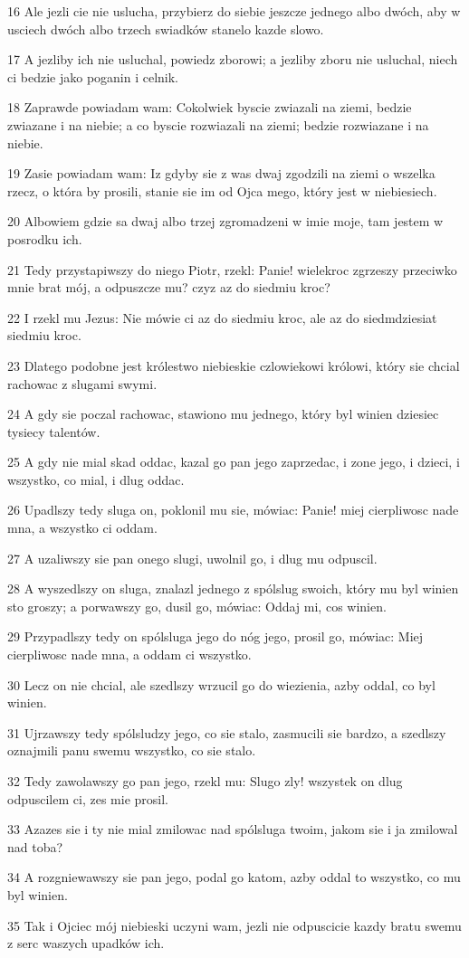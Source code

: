 \par 16 Ale jezli cie nie uslucha, przybierz do siebie jeszcze jednego albo dwóch, aby w usciech dwóch albo trzech swiadków stanelo kazde slowo.
\par 17 A jezliby ich nie usluchal, powiedz zborowi; a jezliby zboru nie usluchal, niech ci bedzie jako poganin i celnik.
\par 18 Zaprawde powiadam wam: Cokolwiek byscie zwiazali na ziemi, bedzie zwiazane i na niebie; a co byscie rozwiazali na ziemi; bedzie rozwiazane i na niebie.
\par 19 Zasie powiadam wam: Iz gdyby sie z was dwaj zgodzili na ziemi o wszelka rzecz, o która by prosili, stanie sie im od Ojca mego, który jest w niebiesiech.
\par 20 Albowiem gdzie sa dwaj albo trzej zgromadzeni w imie moje, tam jestem w posrodku ich.
\par 21 Tedy przystapiwszy do niego Piotr, rzekl: Panie! wielekroc zgrzeszy przeciwko mnie brat mój, a odpuszcze mu? czyz az do siedmiu kroc?
\par 22 I rzekl mu Jezus: Nie mówie ci az do siedmiu kroc, ale az do siedmdziesiat siedmiu kroc.
\par 23 Dlatego podobne jest królestwo niebieskie czlowiekowi królowi, który sie chcial rachowac z slugami swymi.
\par 24 A gdy sie poczal rachowac, stawiono mu jednego, który byl winien dziesiec tysiecy talentów.
\par 25 A gdy nie mial skad oddac, kazal go pan jego zaprzedac, i zone jego, i dzieci, i wszystko, co mial, i dlug oddac.
\par 26 Upadlszy tedy sluga on, poklonil mu sie, mówiac: Panie! miej cierpliwosc nade mna, a wszystko ci oddam.
\par 27 A uzaliwszy sie pan onego slugi, uwolnil go, i dlug mu odpuscil.
\par 28 A wyszedlszy on sluga, znalazl jednego z spólslug swoich, który mu byl winien sto groszy; a porwawszy go, dusil go, mówiac: Oddaj mi, cos winien.
\par 29 Przypadlszy tedy on spólsluga jego do nóg jego, prosil go, mówiac: Miej cierpliwosc nade mna, a oddam ci wszystko.
\par 30 Lecz on nie chcial, ale szedlszy wrzucil go do wiezienia, azby oddal, co byl winien.
\par 31 Ujrzawszy tedy spólsludzy jego, co sie stalo, zasmucili sie bardzo, a szedlszy oznajmili panu swemu wszystko, co sie stalo.
\par 32 Tedy zawolawszy go pan jego, rzekl mu: Slugo zly! wszystek on dlug odpuscilem ci, zes mie prosil.
\par 33 Azazes sie i ty nie mial zmilowac nad spólsluga twoim, jakom sie i ja zmilowal nad toba?
\par 34 A rozgniewawszy sie pan jego, podal go katom, azby oddal to wszystko, co mu byl winien.
\par 35 Tak i Ojciec mój niebieski uczyni wam, jezli nie odpuscicie kazdy bratu swemu z serc waszych upadków ich.

